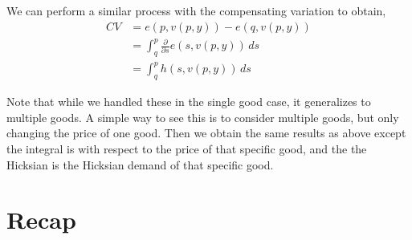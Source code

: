 We can perform a similar process with the compensating variation to obtain,
\begin{align*}
    CV &= e(p, v(p, y)) - e(q, v(p, y)) \\
    &= \int_q^p \frac{\partial}{\partial s} e(s, v(p, y)) \, ds \\
    &= \int_q^p h(s, v(p, y)) \, ds
\end{align*}

Note that while we handled these in the single good case, it generalizes to multiple goods. A simple way to see this is to consider multiple goods, but only changing the price of one good. Then we obtain the same results as above except the integral is with respect to the price of that specific good, and the the Hicksian is the Hicksian demand of that specific good. 

\section*{Recap}